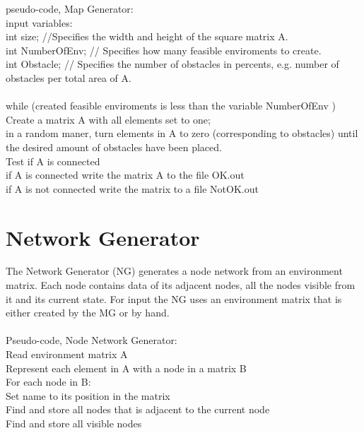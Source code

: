 pseudo-code, Map Generator:\\
input variables:\\
int size; //Specifies the width and height of the square matrix  A.\\
int NumberOfEnv; // Specifies how many feasible enviroments to create.\\
int Obstacle; //  Specifies the number of obstacles in percents, e.g. number of obstacles per total area of A.\\
\\
while (created feasible enviroments is less than the variable NumberOfEnv )\\
	Create a matrix A with all elements set to one; \\
	in a random maner, turn elements in A to zero (corresponding to obstacles) until the desired amount of obstacles have been placed.\\
	Test if A is connected\\
	if A is connected write the matrix A to the file OK.out\\
	if A is not connected write the matrix to a file NotOK.out\\


\section{Network Generator}
The Network Generator (NG) generates a node network from an environment matrix. Each node contains data of its adjacent nodes, all the nodes visible from it and its current state. For input the NG uses an environment matrix that is either created by the MG or by hand.\\
\\
\noindent Pseudo-code, Node Network Generator:\\
\indent Read environment matrix A\\
\indent Represent each element in A with a node in a matrix B\\
\indent For each node in B:\\
\indent \indent Set name to its position in the matrix\\
\indent \indent Find and store all nodes that is adjacent to the current node\\
\indent \indent Find and store all visible nodes
